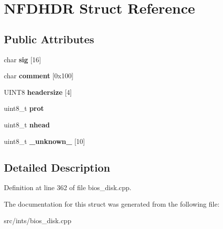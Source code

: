 \hypertarget{structNFDHDR}{\section{N\-F\-D\-H\-D\-R Struct Reference}
\label{structNFDHDR}
}
\subsection*{Public Attributes}
\begin{DoxyCompactItemize}
\item 
\hypertarget{structNFDHDR_a287510a3fba986d88360a51b86662a47}{char {\bfseries sig} \mbox{[}16\mbox{]}}\label{structNFDHDR_a287510a3fba986d88360a51b86662a47}

\item 
\hypertarget{structNFDHDR_a350778cea68716b43c76ae565493e0b7}{char {\bfseries comment} \mbox{[}0x100\mbox{]}}\label{structNFDHDR_a350778cea68716b43c76ae565493e0b7}

\item 
\hypertarget{structNFDHDR_a723cd4bc047e73bed07a4d73194b6f66}{U\-I\-N\-T8 {\bfseries headersize} \mbox{[}4\mbox{]}}\label{structNFDHDR_a723cd4bc047e73bed07a4d73194b6f66}

\item 
\hypertarget{structNFDHDR_a21bbc9bc51e0c4d60f4a346d3200a711}{uint8\-\_\-t {\bfseries prot}}\label{structNFDHDR_a21bbc9bc51e0c4d60f4a346d3200a711}

\item 
\hypertarget{structNFDHDR_aaa6f51d022023940a082286c901d5d48}{uint8\-\_\-t {\bfseries nhead}}\label{structNFDHDR_aaa6f51d022023940a082286c901d5d48}

\item 
\hypertarget{structNFDHDR_a00502b1eed3b27288390871c82277f7d}{uint8\-\_\-t {\bfseries \-\_\-unknown\-\_\-} \mbox{[}10\mbox{]}}\label{structNFDHDR_a00502b1eed3b27288390871c82277f7d}

\end{DoxyCompactItemize}


\subsection{Detailed Description}


Definition at line 362 of file bios\-\_\-disk.\-cpp.



The documentation for this struct was generated from the following file\-:\begin{DoxyCompactItemize}
\item 
src/ints/bios\-\_\-disk.\-cpp\end{DoxyCompactItemize}
